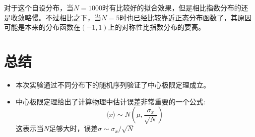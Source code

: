 \documentclass[UTF8]{ctexart}
\begin{document}
\begin{flushleft}
	\quad 对于这个自设分布，当$N=1000$时有比较好的拟合效果，但是相比指数分布的还是收敛略慢。不过相比之下，当$N=5$时也已经比较靠近正态分布函数了，其原因可能是本来的分布函数在$(-1,1)$上的对称性比指数分布的要高。
\end{flushleft}
	


	\newpage
	\section{总结}
	\begin{itemize}
		\item 本次实验通过不同分布下的随机序列验证了中心极限定理成立。
		\item 中心极限定理给出了计算物理中估计误差非常重要的一个公式:
		$$\langle x \rangle \sim N\left(\mu,\frac{\sigma_x}{\sqrt{N}}\right)$$
		这表示当$N$足够大时，误差$\sigma\sim\sigma_x/\sqrt{N}$
	\end{itemize}
	\clearpage
\end{document}

